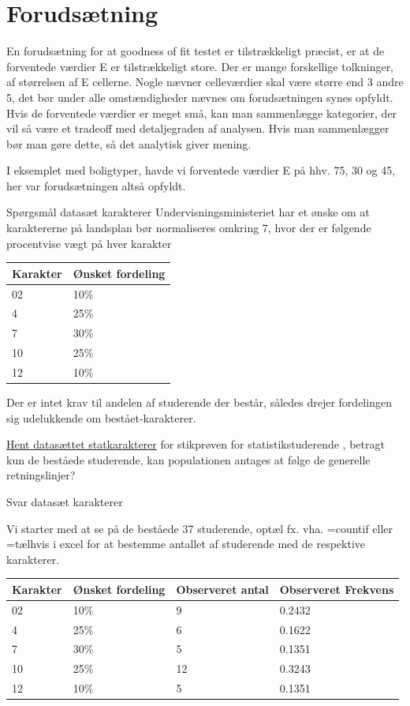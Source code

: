 \documentclass[]{book}
\begin{document}
\hypertarget{forudstning}{%
\section{Forudsætning}\label{forudstning}}

En forudsætning for at goodness of fit testet er tilstrækkeligt præcist, er at de forventede værdier E er tilstrækkeligt store. Der er mange forskellige tolkninger, af størrelsen af E cellerne. Nogle nævner celleværdier skal være større end 3 andre 5, det bør under alle omstændigheder nævnes om forudsætningen synes opfyldt. Hvis de forventede værdier er meget små, kan man sammenlægge kategorier, der vil så være et tradeoff med detaljegraden af analysen. Hvis man sammenlægger bør man gøre dette, så det analytisk giver mening.

I eksemplet med boligtyper, havde vi forventede værdier E på hhv. 75, 30 og 45, her var forudsætningen altså opfyldt.

Spørgsmål datasæt karakterer
Undervisningsministeriet har et ønske om at karaktererne på landsplan bør normaliseres omkring 7, hvor der er følgende procentvise vægt på hver karakter

\begin{longtable}[]{@{}ll@{}}
\toprule
Karakter & Ønsket fordeling\tabularnewline
\midrule
\endhead
02 & 10\%\tabularnewline
4 & 25\%\tabularnewline
7 & 30\%\tabularnewline
10 & 25\%\tabularnewline
12 & 10\%\tabularnewline
\bottomrule
\end{longtable}

Der er intet krav til andelen af studerende der består, således drejer fordelingen sig udelukkende om bestået-karakterer.

\href{https://www.dropbox.com/s/mnsmu56cdkl8yyv/Statkarakterer.xlsx?dl=1}{Hent datasættet statkarakterer} for stikprøven for statistikstuderende , betragt kun de beståede studerende, kan populationen antages at følge de generelle retningslinjer?

Svar datasæt karakterer

Vi starter med at se på de beståede 37 studerende, optæl fx. vha. =countif eller =tælhvis i excel for at bestemme antallet af studerende med de respektive karakterer.

\begin{longtable}[]{@{}llll@{}}
\toprule
Karakter & Ønsket fordeling & Observeret antal & Observeret Frekvens\tabularnewline
\midrule
\endhead
02 & 10\% & 9 & 0.2432\tabularnewline
4 & 25\% & 6 & 0.1622\tabularnewline
7 & 30\% & 5 & 0.1351\tabularnewline
10 & 25\% & 12 & 0.3243\tabularnewline
12 & 10\% & 5 & 0.1351\tabularnewline
\bottomrule
\end{longtable}
\end{document}
